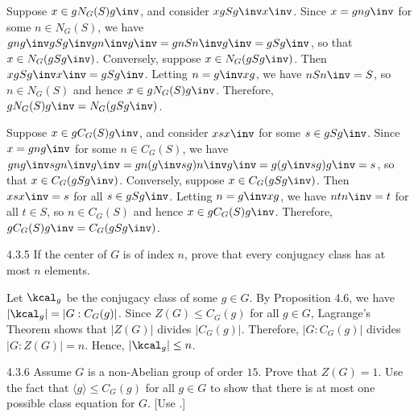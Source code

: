 \begin{sol}
	Suppose $x \in gN_G(S)g\inv$, and consider $xgSg\inv x\inv$.
	Since $x = gng\inv$ for some $n \in N_G(S)$, we have $gng\inv gSg\inv gn\inv g\inv = g n S n\inv g\inv = g S g\inv$, so that $x \in N_G(gSg\inv)$.
	Conversely, suppose $x \in N_G(gSg\inv)$.
	Then $xgSg\inv x\inv = gSg\inv$.
	Letting $n = g\inv x g$, we have $n S n\inv = S$, so $n \in N_G(S)$ and hence $x \in gN_G(S)g\inv$.
	Therefore, $gN_G(S)g\inv = N_G(gSg\inv)$.

	Suppose $x \in gC_G(S)g\inv$, and consider $xsx\inv$ for some $s \in gSg\inv$.
	Since $x = gng\inv$ for some $n \in C_G(S)$, we have $gng\inv s g n\inv g\inv = g n (g\inv s g) n\inv g\inv = g (g\inv s g) g\inv = s$, so that $x \in C_G(gSg\inv)$.
	Conversely, suppose $x \in C_G(gSg\inv)$.
	Then $xsx\inv = s$ for all $s \in gSg\inv$.
	Letting $n = g\inv x g$, we have $n t n\inv = t$ for all $t \in S$, so $n \in C_G(S)$ and hence $x \in gC_G(S)g\inv$.
	Therefore, $gC_G(S)g\inv = C_G(gSg\inv)$.
\end{sol}

\begin{exercise}{4.3.5}
	If the center of $G$ is of index $n$, prove that every conjugacy class has at most $n$ elements.
\end{exercise}

\begin{sol}
	Let $\kcal_g$ be the conjugacy class of some $g \in G$.
	By Proposition 4.6, we have $|\kcal_g| = |G : C_G(g)|$.
	Since $Z(G) \leq C_G(g)$ for all $g \in G$, Lagrange's Theorem shows that $|Z(G)|$ divides $|C_G(g)|$.
	Therefore, $|G : C_G(g)|$ divides $|G : Z(G)| = n$.
	Hence, $|\kcal_g| \leq n$.
\end{sol}

\begin{spex}{4.3.6}
	Assume $G$ is a non-Abelian group of order $15$.
	Prove that $Z(G)=1$.
	Use the fact that $\langle g \rangle \le C_G(g)$ for all $g \in G$ to show that there is at most one possible class equation for $G$. [Use .]
\end{spex}

